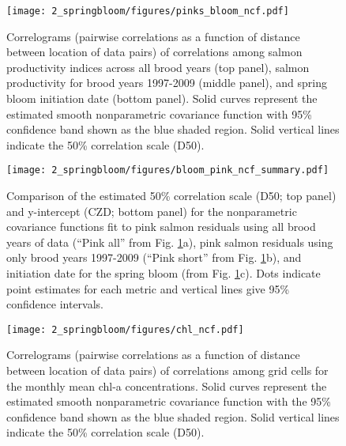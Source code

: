 \begin{figure}[htbp]
  \centering \texttt{[image: 2\_springbloom/figures/pinks\_bloom\_ncf.pdf]}
  \caption[Correlograms of correlations among salmon productivity
    indices and spring bloom initiation date.]{Correlograms (pairwise
    correlations as a function of distance between location of data pairs) of
    correlations among salmon productivity indices across all brood years (top
    panel), salmon productivity for brood years 1997-2009 (middle panel), and
    spring bloom initiation date (bottom panel). Solid curves represent the
    estimated smooth nonparametric covariance function with 95\% confidence band
    shown as the blue shaded region. Solid vertical lines indicate the 50\%
    correlation scale (D50).}
  \label{fig:bloom:2}
\end{figure}

\begin{figure}[htbp]
  \centering \texttt{[image: 2\_springbloom/figures/bloom\_pink\_ncf\_summary.pdf]}
  \caption[Comparison of the estimated 50\% correlation scale
    and y-intercept from the nonparametric covariance functions.]{Comparison of
    the estimated 50\% correlation scale (D50; 
    top panel) and y-intercept (CZD; bottom panel) for the nonparametric
    covariance functions fit to pink salmon residuals using all brood years of
    data (``Pink all'' from Fig. \ref{fig:bloom:2}a), pink salmon residuals
    using only brood years 1997-2009 (``Pink short'' from Fig.
    \ref{fig:bloom:2}b), and initiation date for the spring bloom (from Fig.
    \ref{fig:bloom:2}c). Dots indicate point estimates for each metric and
    vertical lines give 95\% confidence intervals.}
  \label{fig:bloom:3}
\end{figure}

\begin{figure}[htbp]
  \centering \texttt{[image: 2\_springbloom/figures/chl\_ncf.pdf]}
  \caption[Correlograms of correlations among grid cells for the monthly
    mean chl-a concentrations.]{Correlograms (pairwise correlations as a
    function of distance between location of data pairs) of correlations among
    grid cells for the monthly mean chl-a concentrations. Solid curves represent
    the estimated smooth nonparametric covariance function with the 95\%
    confidence band shown as the blue shaded region. Solid vertical lines
    indicate the 50\% correlation scale (D50).}
  \label{fig:bloom:4}
\end{figure}

